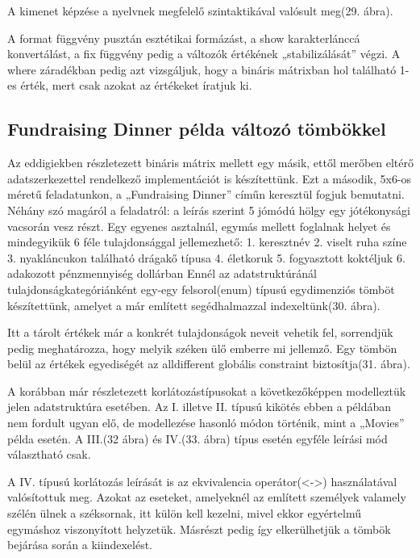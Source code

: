 \documentclass[12pt,a4paper,twoside, openright]{report}
\begin{document}
    A kimenet képzése a nyelvnek megfelelő szintaktikával valósult meg(29. ábra).


    A format függvény pusztán esztétikai formázást, a show karakterlánccá konvertálást, a fix függvény pedig a változók értékének „stabilizálását” végzi.
    A where záradékban pedig azt vizsgáljuk, hogy a bináris mátrixban hol található 1-es érték, mert csak azokat az értékeket íratjuk ki.

\subsection{Fundraising Dinner példa változó tömbökkel}

    Az eddigiekben részletezett bináris mátrix mellett egy másik, ettől merőben eltérő adatszerkezettel rendelkező implementációt is készítettünk.
    Ezt a második, 5x6-os méretű feladatunkon, a „Fundraising Dinner” címűn keresztül fogjuk bemutatni.
    Néhány szó magáról a feladatról: a leírás szerint 5 jómódú hölgy egy jótékonysági vacsorán vesz részt.
    Egy egyenes asztalnál, egymás mellett foglalnak helyet és mindegyikük 6 féle tulajdonsággal jellemezhető:
    1. keresztnév
    2. viselt ruha színe
    3. nyakláncukon található drágakő típusa
    4.	életkoruk
    5. fogyasztott koktéljuk
    6. adakozott pénzmennyiség dollárban
    Ennél az adatstruktúránál tulajdonságkategóriánként egy-egy felsorol(enum) típusú egydimenziós tömböt készítettünk, amelyet a már említett segédhalmazzal indexeltünk(30. ábra).


    Itt a tárolt értékek már a konkrét tulajdonságok neveit vehetik fel, sorrendjük pedig meghatározza, hogy melyik széken ülő emberre mi jellemző.
    Egy tömbön belül az értékek egyediségét az alldifferent globális constraint biztosítja(31. ábra).


    A korábban már részletezett korlátozástípusokat a következőképpen modelleztük jelen adatstruktúra esetében.
    Az I. illetve II. típusú kikötés ebben a példában nem fordult ugyan elő, de modellezése hasonló módon történik, mint a „Movies” példa esetén.
    A III.(32 ábra) és IV.(33. ábra) típus esetén egyféle leírási mód választható csak.


    A IV. típusú korlátozás leírását is az ekvivalencia operátor(<->) használatával valósítottuk meg.
    Azokat az eseteket, amelyeknél az említett személyek valamely szélén ülnek a széksornak, itt külön kell kezelni, mivel ekkor egyértelmű egymáshoz viszonyított helyzetük.
    Másrészt pedig így elkerülhetjük a tömbök bejárása során a 
    kiindexelést.
\end{document}
